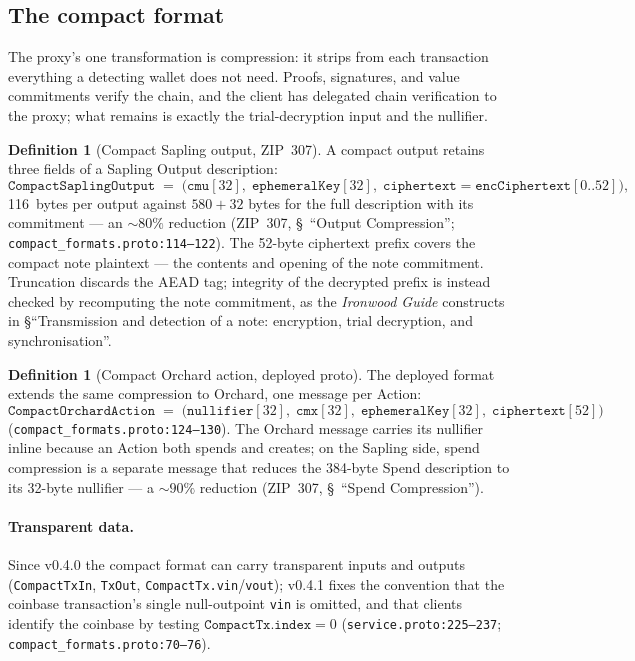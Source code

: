 \documentclass[11pt,a4paper]{article}
\theoremstyle{definition}
\newtheorem{definition}[theorem]{Definition}
\begin{document}
\subsection{The compact format}\label{sec:sync-service-compact}

The proxy's one transformation is compression: it strips from each
transaction everything a detecting wallet does not need. Proofs,
signatures, and value commitments verify the chain, and the client has
delegated chain verification to the proxy; what remains is exactly the
trial-decryption input and the nullifier.

\begin{definition}[Compact Sapling output, ZIP~307]
\label{def:sync-compact-output}
A compact output retains three fields of a Sapling Output description:
\[
\mathtt{CompactSaplingOutput} \;=\;
\bigl(\mathtt{cmu}[32],\; \mathtt{ephemeralKey}[32],\;
\mathtt{ciphertext} = \mathtt{encCiphertext}[0..52]\bigr),
\]
116~bytes per output against $580 + 32$ bytes for the full description
with its commitment --- an ${\sim}80\%$ reduction (ZIP~307, \S~``Output
Compression''; \texttt{compact\_formats.proto:114--122}). The 52-byte
ciphertext prefix covers the compact note plaintext --- the contents and
opening of the note commitment. Truncation discards the AEAD tag;
integrity of the decrypted prefix is instead checked by recomputing the
note commitment, as the \emph{Ironwood Guide} constructs in
\S``Transmission and detection of a note: encryption, trial decryption,
and synchronisation''.
\end{definition}

\begin{definition}[Compact Orchard action, deployed proto]
\label{def:sync-compact-action}
The deployed format extends the same compression to Orchard, one message
per Action:
\[
\mathtt{CompactOrchardAction} \;=\;
\bigl(\mathtt{nullifier}[32],\; \mathtt{cmx}[32],\;
\mathtt{ephemeralKey}[32],\; \mathtt{ciphertext}[52]\bigr)
\]
(\texttt{compact\_formats.proto:124--130}). The Orchard message carries
its nullifier inline because an Action both spends and creates; on the
Sapling side, spend compression is a separate message that reduces the
384-byte Spend description to its 32-byte nullifier --- a ${\sim}90\%$
reduction (ZIP~307, \S~``Spend Compression'').
\end{definition}

\paragraph{Transparent data.} Since v0.4.0 the compact format can carry
transparent inputs and outputs (\texttt{CompactTxIn}, \texttt{TxOut},
\texttt{CompactTx.vin}/\texttt{vout}); v0.4.1 fixes the convention that
the coinbase transaction's single null-outpoint \texttt{vin} is omitted,
and that clients identify the coinbase by testing
$\mathtt{CompactTx.index} = 0$ (\texttt{service.proto:225--237};
\texttt{compact\_formats.proto:70--76}).
\end{document}
